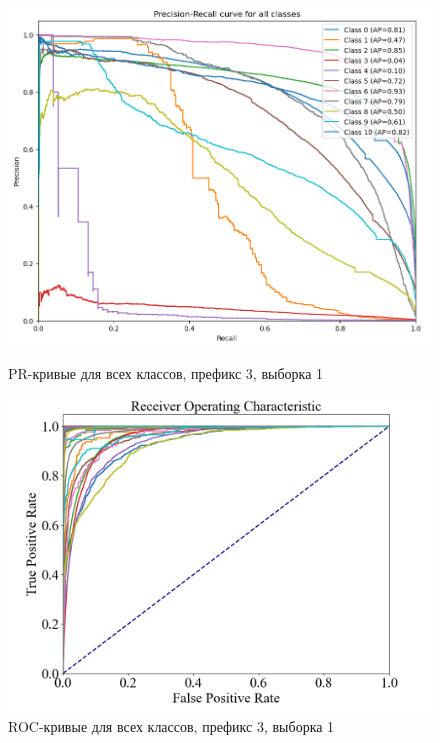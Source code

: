 \documentclass{article}
\begin{document}
\begin{figure}[!ht]
    \begin{minipage}[b]{0.48\textwidth}
        \centering
        \includegraphics[width=\linewidth]{pr_with_bad.png}
        \caption{PR-кривые для всех классов, префикс 3, выборка 1}
        \label{fig:pr1}
    \end{minipage}
    \hfill
    \begin{minipage}[b]{0.54\textwidth}
        \centering
        \includegraphics[width=\linewidth]{roc_with_bad.png}
        \caption{ROC-кривые для всех классов, префикс 3, выборка 1}
        \label{fig:roc1}
    \end{minipage}
\end{figure}
\end{document}
